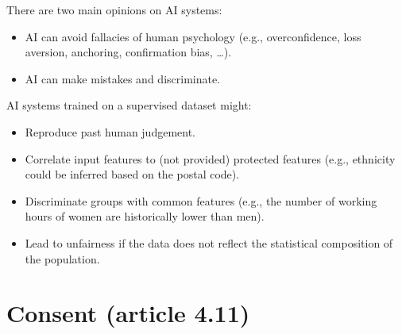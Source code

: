 There are two main opinions on AI systems:
\begin{itemize}
    \item AI can avoid fallacies of human psychology (e.g., overconfidence, loss aversion, anchoring, confirmation bias, \dots).
    \item AI can make mistakes and discriminate.
\end{itemize}

\begin{remark}
    AI systems trained on a supervised dataset might:
    \begin{itemize}
        \item Reproduce past human judgement.
        \item Correlate input features to (not provided) protected features (e.g., ethnicity could be inferred based on the postal code).
        \item Discriminate groups with common features (e.g., the number of working hours of women are historically lower than men).
        \item Lead to unfairness if the data does not reflect the statistical composition of the population.
    \end{itemize}
\end{remark}



\section{Consent (article 4.11)}

